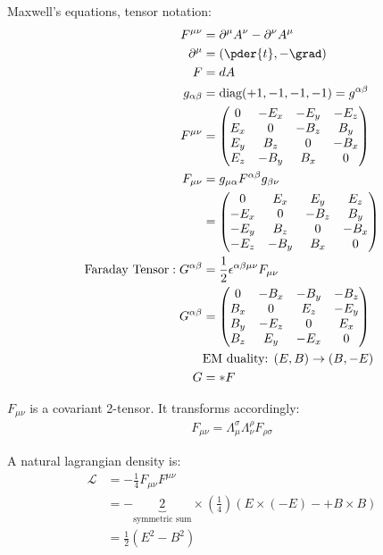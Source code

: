 \documentclass[10pt]{scrartcl}
\begin{document}
Maxwell's equations, tensor notation:
\begin{align*}
	F^{\mu \nu} &= \partial^\mu A^\nu - \partial^\nu A^\mu \\
	\partial^\mu &= (\pder{t}, - \grad) \\
	F &= d A \\
	g_{\alpha \beta} &= \text{diag} (+1, -1, -1, -1) = g^{\alpha \beta} \\
	F^{\mu \nu} &= \begin{pmatrix}
		0 & -E_x & -E_y  & -E_z \\
		E_x & 0 & -B_z & B_y  \\ 
		E_y & B_z &  0 & -B_x \\
		E_z & -B_y & B_x & 0 \\
	\end{pmatrix} \\
	F_{\mu \nu} &= g_{\mu \alpha} F^{\alpha \beta} g_{\beta \nu} \\
	&=   \begin{pmatrix}
		0 & E_x & E_y  & E_z \\
		-E_x & 0 & -B_z & B_y  \\ 
		-E_y & B_z &  0 & -B_x \\
		-E_z & -B_y & B_x & 0 \\
	\end{pmatrix} \\
	\text{Faraday Tensor}: G^{\alpha \beta} & = \frac12 \epsilon^{\alpha \beta \mu \nu} F_{\mu \nu} \\
	G^{\alpha \beta} &= \begin{pmatrix}
		0 & -B_x & -B_y  & -B_z \\
		B_x & 0 & E_z & -E_y  \\ 
		B_y & -E_z &  0 & E_x \\
		B_z & E_y & -E_x & 0 \\
	\end{pmatrix}  \\
	& \text{EM duality: } (E, B) \rightarrow (B, -E) \\
	G &= * F \\
\end{align*}

$F_{\mu \nu}$ is a covariant 2-tensor.  It transforms accordingly:
\begin{align}
	F_{\mu \nu} = \Lambda^{\sigma}_{\mu} \Lambda^{\rho}_{\nu} F_{\rho \sigma}
\end{align}

A natural lagrangian density is:
\begin{align*}
	\mathcal{L} & = -\frac14 F_{\mu \nu} F^{\mu \nu} \\
	& = - \underbrace{2}_{\text{symmetric sum}}  \times (\frac14) \left( E \times  (-E) - + B \times B\right) \\
	& = \frac12 \left(E^2 - B^2 \right)
\end{align*}
\end{document}
